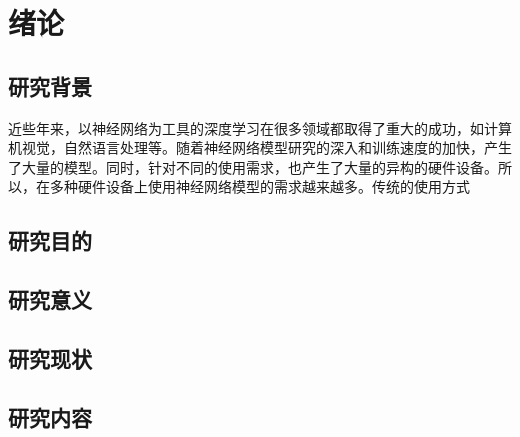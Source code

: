\chapter{绪论}

\section{研究背景}

近些年来，以神经网络为工具的深度学习在很多领域都取得了重大的成功，如计算机视觉，自然语言处理等。随着神经网络模型研究的深入和训练速度的加快，产生了大量的模型。同时，针对不同的使用需求，也产生了大量的异构的硬件设备。所以，在多种硬件设备上使用神经网络模型的需求越来越多。传统的使用方式

\section{研究目的}


\section{研究意义}


\section{研究现状}


\section{研究内容}


